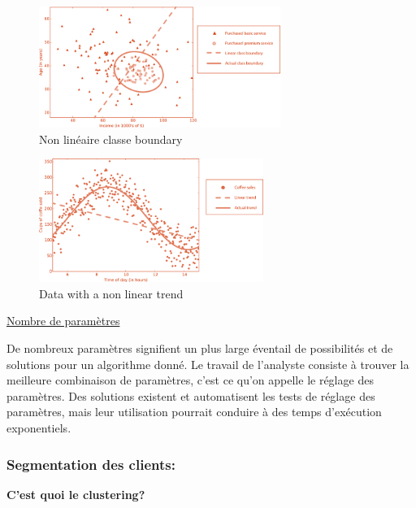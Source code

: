 \documentclass[12pt]{article}
\begin{document}
{%

\begin{figure}[H]
	\centering
    \includegraphics[width=0.70\textwidth]{image4.png}
     \caption{Non linéaire classe boundary}
    \label{fig:4}
\end{figure}


\begin{figure}[H]
	\centering
    \includegraphics[width=0.65\textwidth]{image5.png}
     \caption{Data with a non linear trend}
    \label{fig:5}
\end{figure}

\underline{Nombre de paramètres}

De nombreux paramètres signifient un plus large éventail de possibilités et de solutions pour un algorithme donné. Le travail de l'analyste consiste à trouver la meilleure combinaison de paramètres, c'est ce qu'on appelle le réglage des paramètres. Des solutions existent et automatisent les tests de réglage des paramètres, mais leur utilisation pourrait conduire à des temps d'exécution exponentiels.
\subsubsection{	Segmentation des clients:}
\textbf{C’est quoi le clustering?}

}
\end{document}
